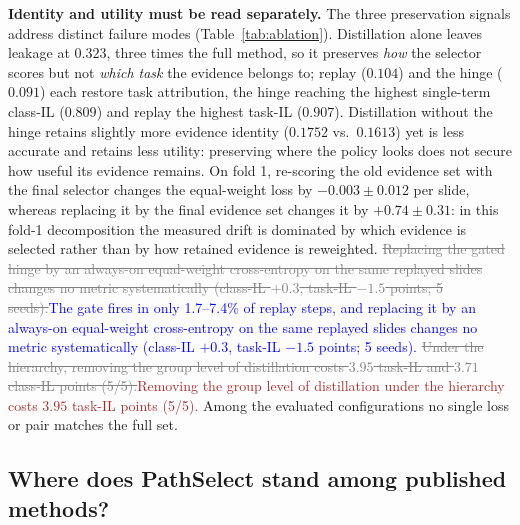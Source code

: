 \documentclass{article}
\newif\ifmarkup \markuptrue
\newcommand{\repc}[3]{\ifmarkup\textcolor{gray}{\sout{#2}}\textcolor{#1}{#3}\else#3\fi}
\newcommand{\repB}[2]{\repc{brown}{#1}{#2}}   %
\newcommand{\repL}[2]{\repc{blue}{#1}{#2}}    %
\begin{document}
\textbf{Identity and utility must be read separately.} The three preservation signals address distinct failure modes (Table~\ref{tab:ablation}). Distillation alone leaves leakage at $0.323$, three times the full method, so it preserves \emph{how} the selector scores but not \emph{which task} the evidence belongs to; replay ($0.104$) and the hinge ($0.091$) each restore task attribution, the hinge reaching the highest single-term class-IL ($0.809$) and replay the highest task-IL ($0.907$). Distillation without the hinge retains slightly more evidence identity ($0.1752$ vs.\ $0.1613$) yet is less accurate and retains less utility: preserving where the policy looks does not secure how useful its evidence remains. On fold 1, re-scoring the old evidence set with the final selector changes the equal-weight loss by $-0.003{\pm}0.012$ per slide, whereas replacing it by the final evidence set changes it by $+0.74{\pm}0.31$: in this fold-1 decomposition the measured drift is dominated by which evidence is selected rather than by how retained evidence is reweighted. \repL{Replacing the gated hinge by an always-on equal-weight cross-entropy on the same replayed slides changes no metric systematically (class-IL $+0.3$, task-IL $-1.5$ points; 5 seeds).}{The gate fires in only 1.7--7.4\% of replay steps, and replacing it by an always-on equal-weight cross-entropy on the same replayed slides changes no metric systematically (class-IL $+0.3$, task-IL $-1.5$ points; 5 seeds).} \repB{Under the hierarchy, removing the group level of distillation costs $3.95$ task-IL and $3.71$ class-IL points (5/5).}{Removing the group level of distillation under the hierarchy costs $3.95$ task-IL points (5/5).} Among the evaluated configurations no single loss or pair matches the full set.

\subsection{Where does PathSelect stand among published methods?}
\label{ssec:sota}
\end{document}
